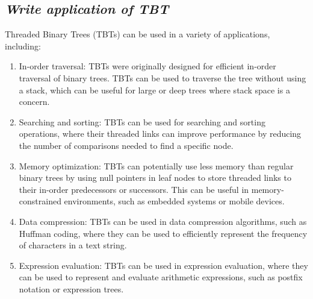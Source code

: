 \documentclass{article}
\begin{document}
\subsection{\textit{Write application of TBT}}
Threaded Binary Trees (TBTs) can be used in a variety of applications, including:
\begin{enumerate}
	\item In-order traversal: TBTs were originally designed for efficient in-order traversal of binary trees. TBTs can be used to traverse the tree without using a stack, which can be useful for large or deep trees where stack space is a concern.
	\item Searching and sorting: TBTs can be used for searching and sorting operations, where their threaded links can improve performance by reducing the number of comparisons needed to find a specific node.
	\item Memory optimization: TBTs can potentially use less memory than regular binary trees by using null pointers in leaf nodes to store threaded links to their in-order predecessors or successors. This can be useful in memory-constrained environments, such as embedded systems or mobile devices.
	\item Data compression: TBTs can be used in data compression algorithms, such as Huffman coding, where they can be used to efficiently represent the frequency of characters in a text string.
	\item Expression evaluation: TBTs can be used in expression evaluation, where they can be used to represent and evaluate arithmetic expressions, such as postfix notation or expression trees.
\end{enumerate}
\end{document}
